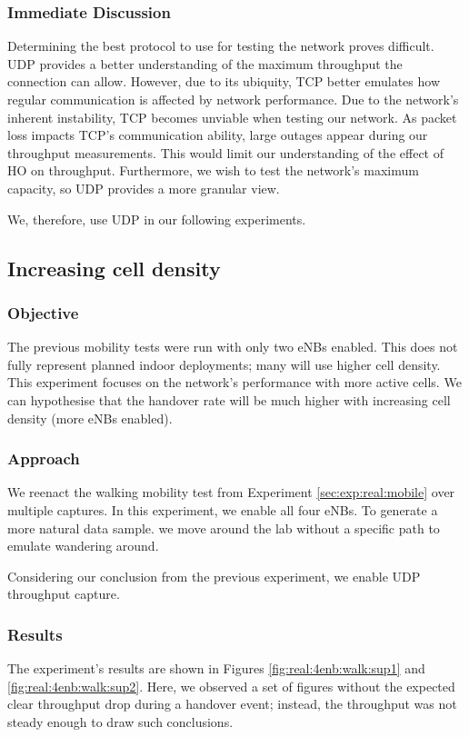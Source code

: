 \subsubsection{Immediate Discussion}
Determining the best protocol to use for testing the network proves difficult. UDP provides a better understanding of the maximum throughput the connection can allow. However, due to its ubiquity, TCP better emulates how regular communication is affected by network performance.
Due to the network's inherent instability, TCP becomes unviable when testing our network. As packet loss impacts TCP's communication ability, large outages appear during our throughput measurements. This would limit our understanding of the effect of HO on throughput. Furthermore, we wish to test the network's maximum capacity, so UDP provides a more granular view.

We, therefore, use UDP in our following experiments.

\subsection{Increasing cell density}

\subsubsection{Objective}
The previous mobility tests were run with only two eNBs enabled. This does not fully represent planned indoor deployments; many will use higher cell density. This experiment focuses on the network's performance with more active cells. We can hypothesise that the handover rate will be much higher with increasing cell density (more eNBs enabled).

\subsubsection{Approach}
We reenact the walking mobility test from Experiment \ref{sec:exp:real:mobile} over multiple captures. In this experiment, we enable all four eNBs. To generate a more natural data sample. we move around the lab without a specific path to emulate wandering around.

Considering our conclusion from the previous experiment, we enable UDP throughput capture.
\subsubsection{Results}
The experiment's results are shown in Figures \ref{fig:real:4enb:walk:sup1} and \ref{fig:real:4enb:walk:sup2}. Here, we observed a set of figures without the expected clear throughput drop during a handover event; instead, the throughput was not steady enough to draw such conclusions.

